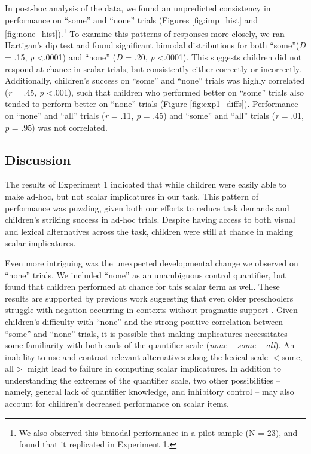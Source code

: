 \documentclass[man]{apa2}
\begin{document}
In post-hoc analysis of the data, we found an unpredicted consistency in performance on ``some'' and ``none'' trials (Figures \ref{fig:imp_hist} and \ref{fig:none_hist}).\footnote{We also observed this bimodal performance in a pilot sample (N = 23), and found that it replicated in Experiment 1.}  To examine this patterns of responses more closely, we ran Hartigan's dip test and found significant bimodal distributions for both ``some''(\textit{D} = .15, \textit{p} \textless  .0001) and ``none'' (\textit{D} = .20, \textit{p} \textless  .0001). This suggests children did not respond at chance in scalar trials, but consistently either correctly or incorrectly. Additionally, children's success on ``some'' and ``none'' trials was highly correlated (\textit{r} = .45, \textit{p} \textless  .001), such that children who performed better on ``some'' trials also tended to perform better on ``none'' trials (Figure \ref{fig:exp1_diffs}). Performance on ``none'' and ``all'' trials (\textit{r} = .11, \textit{p} = .45) and ``some'' and ``all'' trials (\textit{r} = .01, \textit{p} = .95) was not correlated. 

\subsection{Discussion}

The results of Experiment 1 indicated that while children were easily able to make ad-hoc, but not scalar implicatures in our task. This pattern of performance was puzzling, given both our efforts to reduce task demands and children's striking success in ad-hoc trials. Despite having access to both visual and lexical alternatives across the task, children were still at chance in making scalar implicatures. 

Even more intriguing was the unexpected developmental change we observed on ``none'' trials. We included ``none'' as an unambiguous control quantifier, but found that children performed at chance for this scalar term as well. These results are supported by previous work suggesting that even older preschoolers struggle with negation occurring in contexts without pragmatic support \cite{nordmeyer2014}. Given children's difficulty with ``none'' and the strong positive correlation between ``some'' and ``none'' trials, it is possible that making implicatures necessitates some familiarity with both ends of the quantifier scale (\textit{none -- some -- all}). An inability to use and contrast relevant alternatives along the lexical scale $<${\sc some, all}$>$ might lead to failure in computing scalar implicatures. In addition to understanding the extremes of the quantifier scale, two other possibilities -- namely, general lack of quantifier knowledge, and inhibitory control -- may also account for children's decreased performance on scalar items. 
\end{document}
